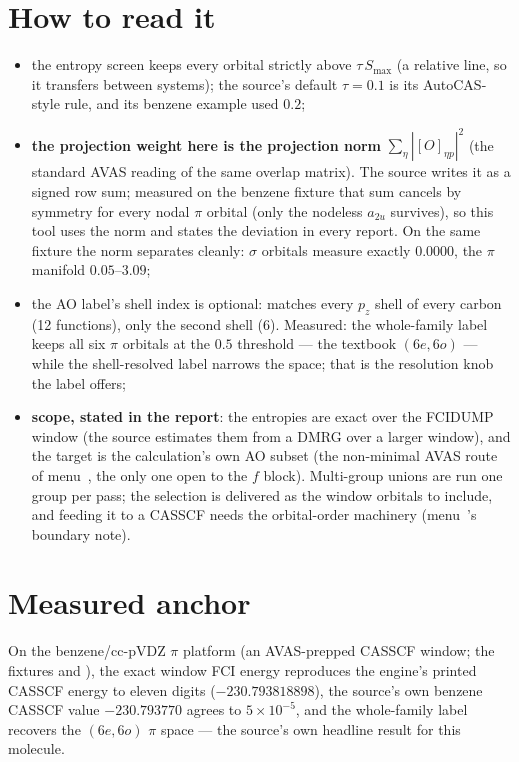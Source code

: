 \section{How to read it}

\begin{readbox}
\begin{itemize}
  \item the entropy screen keeps every orbital strictly above
    $\tau\, S_{\max}$ (a relative line, so it transfers between systems);
    the source's default $\tau = 0.1$ is its AutoCAS-style rule, and its
    benzene example used $0.2$;
  \item \textbf{the projection weight here is the projection norm}
    $\sum_\eta |[O]_{\eta p}|^2$ (the standard AVAS reading of the same
    overlap matrix).  The source writes it as a signed row sum; measured on
    the benzene fixture that sum cancels by symmetry for every nodal $\pi$
    orbital (only the nodeless $a_{2u}$ survives), so this tool uses the norm
    and states the deviation in every report.  On the same fixture the norm
    separates cleanly: $\sigma$ orbitals measure exactly $0.0000$, the
    $\pi$ manifold $0.05$--$3.09$;
  \item the AO label's shell index is optional:  matches every
    $p_z$ shell of every carbon (12 functions),  only the second
    shell (6).  Measured: the whole-family label keeps all six $\pi$ orbitals
    at the $0.5$ threshold --- the textbook $(6e, 6o)$ --- while the
    shell-resolved label narrows the space; that is the resolution knob the
    label offers;
  \item \textbf{scope, stated in the report}: the entropies are exact over
    the FCIDUMP window (the source estimates them from a DMRG over a larger
    window), and the target is the calculation's own AO subset (the
    non-minimal AVAS route of menu~, the only one open to the
    $f$ block).  Multi-group unions are run one group per pass; the selection
    is delivered as the window orbitals to include, and feeding it to a
    CASSCF needs the orbital-order machinery (menu~'s boundary
    note).
\end{itemize}
\end{readbox}

\section{Measured anchor}

On the benzene/cc-pVDZ $\pi$ platform (an AVAS-prepped CASSCF window; the
fixtures  and ), the exact window FCI
energy reproduces the engine's printed CASSCF energy to eleven digits
($-230.793818898$), the source's own benzene CASSCF value $-230.793770$
agrees to $5\times10^{-5}$, and the whole-family label recovers the
$(6e, 6o)$ $\pi$ space --- the source's own headline result for this molecule.
